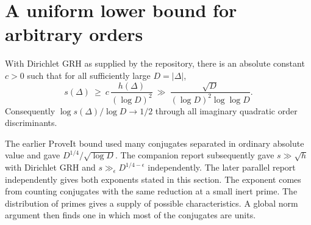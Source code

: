 \section{A uniform lower bound for arbitrary orders}\label{sec:uniform}
\begin{theorem}\label{thm:growth}
With Dirichlet GRH as supplied by the repository, there is an absolute constant $c>0$ such that for all sufficiently large $D=|\Delta|$,
\[
 s(\Delta)\ \ge\ c\,\frac{h(\Delta)}{(\log D)^2}
 \ \gg\ \frac{\sqrt D}{(\log D)^2\log\log D}.
\]
Consequently $\log s(\Delta)/\log D\to1/2$ through all imaginary quadratic order discriminants.
\end{theorem}
The earlier ProveIt bound used many conjugates separated in ordinary absolute value and gave $D^{1/4}/\sqrt{\log D}$. The companion report subsequently gave $s\gg\sqrt h$ with Dirichlet GRH and $s\gg_\epsilon D^{1/4-\epsilon}$ independently.\cite{companion} The later parallel report independently gives both exponents stated in this section.\cite{sparseparallel} The exponent comes from counting conjugates with the same reduction at a small inert prime. The distribution of primes gives a supply of possible characteristics. A global norm argument then finds one in which most of the conjugates are units.

